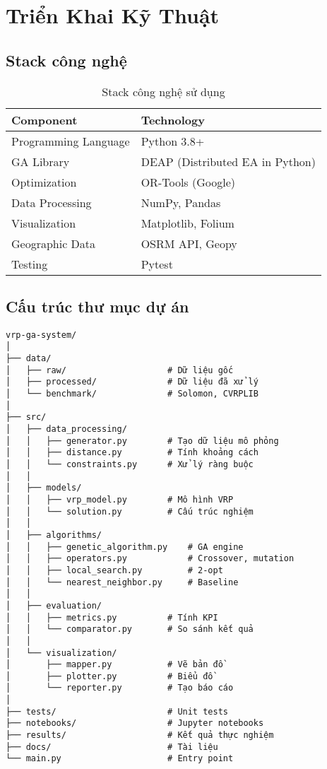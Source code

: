 \documentclass[12pt,a4paper]{article}
\begin{document}
\newpage

\section{Triển Khai Kỹ Thuật}

\subsection{Stack công nghệ}

\begin{table}[h]
\centering
\begin{tabular}{@{}ll@{}}
\toprule
\textbf{Component} & \textbf{Technology} \\ \midrule
Programming Language & Python 3.8+ \\
GA Library & DEAP (Distributed EA in Python) \\
Optimization & OR-Tools (Google) \\
Data Processing & NumPy, Pandas \\
Visualization & Matplotlib, Folium \\
Geographic Data & OSRM API, Geopy \\
Testing & Pytest \\ \bottomrule
\end{tabular}
\caption{Stack công nghệ sử dụng}
\end{table}

\subsection{Cấu trúc thư mục dự án}

\begin{verbatim}
vrp-ga-system/
│
├── data/
│   ├── raw/                    # Dữ liệu gốc
│   ├── processed/              # Dữ liệu đã xử lý
│   └── benchmark/              # Solomon, CVRPLIB
│
├── src/
│   ├── data_processing/
│   │   ├── generator.py        # Tạo dữ liệu mô phỏng
│   │   ├── distance.py         # Tính khoảng cách
│   │   └── constraints.py      # Xử lý ràng buộc
│   │
│   ├── models/
│   │   ├── vrp_model.py        # Mô hình VRP
│   │   └── solution.py         # Cấu trúc nghiệm
│   │
│   ├── algorithms/
│   │   ├── genetic_algorithm.py    # GA engine
│   │   ├── operators.py            # Crossover, mutation
│   │   ├── local_search.py         # 2-opt
│   │   └── nearest_neighbor.py     # Baseline
│   │
│   ├── evaluation/
│   │   ├── metrics.py          # Tính KPI
│   │   └── comparator.py       # So sánh kết quả
│   │
│   └── visualization/
│       ├── mapper.py           # Vẽ bản đồ
│       ├── plotter.py          # Biểu đồ
│       └── reporter.py         # Tạo báo cáo
│
├── tests/                      # Unit tests
├── notebooks/                  # Jupyter notebooks
├── results/                    # Kết quả thực nghiệm
├── docs/                       # Tài liệu
└── main.py                     # Entry point
\end{verbatim}
\end{document}
